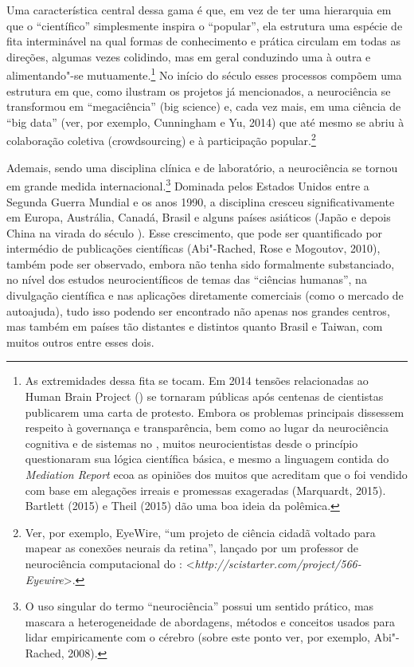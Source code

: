 Uma característica central dessa gama é que, em vez de ter uma
hierarquia em que o ``científico'' simplesmente inspira o ``popular'',
ela estrutura uma espécie de fita interminável na qual formas de
conhecimento e prática circulam em todas as direções, algumas vezes
colidindo, mas em geral conduzindo uma à outra e alimentando"-se
mutuamente.\footnote{As extremidades dessa fita se tocam. Em 2014 tensões relacionadas
ao Human Brain Project () se tornaram públicas após centenas de
cientistas publicarem uma carta de protesto. Embora os problemas
principais dissessem respeito à governança e transparência, bem como ao
lugar da neurociência cognitiva e de sistemas no , muitos
neurocientistas desde o princípio questionaram sua lógica científica
básica, e mesmo a linguagem contida do \emph{Mediation Report} ecoa as
opiniões dos muitos que acreditam que o  foi vendido com base em
alegações irreais e promessas exageradas (Marquardt, 2015). Bartlett
(2015) e Theil (2015) dão uma boa ideia da polêmica.} No início do século  esses processos
compõem uma estrutura em que, como ilustram os projetos já mencionados,
a neurociência se transformou em ``megaciência'' (big science) e, cada
vez mais, em uma ciência de ``big data'' (ver, por exemplo, Cunningham e
Yu, 2014) que até mesmo se abriu à colaboração coletiva (crowdsourcing)
e à participação popular.\footnote{Ver, por exemplo, EyeWire, ``um projeto de ciência cidadã voltado
para mapear as conexões neurais da retina'', lançado por um professor de
neurociência computacional do :
\textless{}\emph{http://scistarter.com/project/566-Eyewire}\textgreater{}.}

Ademais, sendo uma disciplina clínica e de laboratório, a neurociência
se tornou em grande medida internacional.\footnote{O uso singular do termo ``neurociência'' possui um sentido prático,
mas mascara a heterogeneidade de abordagens, métodos e conceitos usados
para lidar empiricamente com o cérebro (sobre este ponto ver, por
exemplo, Abi"-Rached, 2008).} Dominada
pelos Estados Unidos entre a Segunda Guerra Mundial e os anos 1990, a
disciplina cresceu significativamente em Europa, Austrália, Canadá,
Brasil e alguns países asiáticos (Japão e depois China na virada do
século ). Esse crescimento, que pode ser quantificado por intermédio
de publicações científicas (Abi"-Rached, Rose e Mogoutov, 2010), também
pode ser observado, embora não tenha sido formalmente substanciado, no
nível dos estudos neurocientíficos de temas das ``ciências humanas'', na
divulgação científica e nas aplicações diretamente comerciais (como o
mercado de autoajuda), tudo isso podendo ser encontrado não apenas nos
grandes centros, mas também em países tão distantes e distintos quanto
Brasil e Taiwan, com muitos outros entre esses dois.

